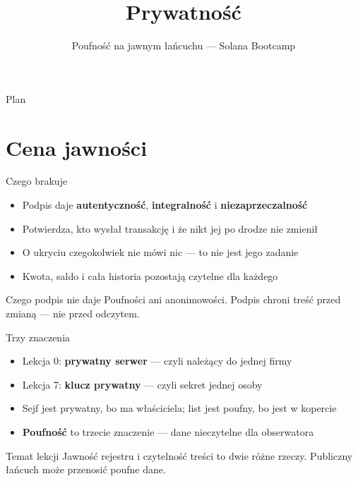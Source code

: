 

\usepackage[utf8]{inputenc}
\usepackage[T1]{fontenc}
\usepackage{amsmath}

\title{Prywatność}
\subtitle{Poufność na jawnym łańcuchu --- Solana Bootcamp}
\author{}



\maketitleframe

\begin{frame}{Plan}
  \tableofcontents
\end{frame}

\section{Cena jawności}

\begin{frame}{Czego brakuje}
  \begin{itemize}
    \item Podpis daje \textbf{autentyczność}, \textbf{integralność} i \textbf{niezaprzeczalność}
    \item Potwierdza, kto wysłał transakcję i że nikt jej po drodze nie zmienił
    \item O ukryciu czegokolwiek nie mówi nic --- to nie jest jego zadanie
    \item Kwota, saldo i cała historia pozostają czytelne dla każdego
  \end{itemize}
  \vspace{0.25cm}
  \begin{alertblock}{Czego podpis nie daje}
    Poufności ani anonimowości. Podpis chroni treść przed zmianą ---
    nie przed odczytem.
  \end{alertblock}
\end{frame}

\begin{frame}{Trzy znaczenia}
  \begin{itemize}
    \item Lekcja 0: \textbf{prywatny serwer} --- czyli należący do jednej firmy
    \item Lekcja 7: \textbf{klucz prywatny} --- czyli sekret jednej osoby
    \item Sejf jest prywatny, bo ma właściciela; list jest poufny, bo jest w kopercie
    \item \textbf{Poufność} to trzecie znaczenie --- dane nieczytelne dla obserwatora
  \end{itemize}
  \vspace{0.25cm}
  \begin{block}{Temat lekcji}
    Jawność rejestru i czytelność treści to dwie różne rzeczy.
    Publiczny łańcuch może przenosić poufne dane.
  \end{block}
\end{frame}

